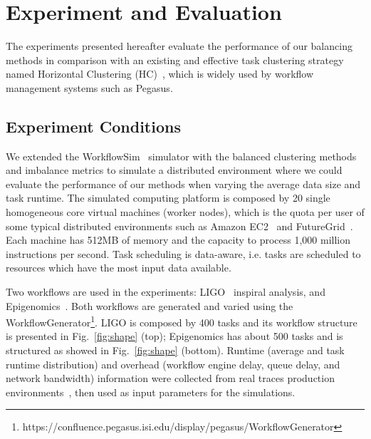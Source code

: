 \documentclass[final,5p,times,twocolumn]{elsarticle}
\begin{document}
\section{Experiment and Evaluation}
\label{sec:experiments}

The experiments presented hereafter evaluate the performance of our balancing methods in comparison with an existing and effective task clustering strategy named Horizontal Clustering (HC)~\cite{Singh:2008:WTC:1341811.1341822}, which is widely used by workflow management systems such as Pegasus. 

\subsection{Experiment Conditions}

We extended the WorkflowSim~\cite{WorkflowSim} simulator with the balanced clustering methods and imbalance metrics to simulate a distributed environment where we could evaluate the performance of our methods when varying the average data size and task runtime. The simulated computing platform is composed by 20 single homogeneous core virtual machines (worker nodes), which is the quota per user of some typical distributed environments such as Amazon EC2~\cite{AmazonAWS} and FutureGrid~\cite{FutureGrid}. Each machine has 512MB of memory and the capacity to process 1,000 million instructions per second. Task scheduling is data-aware, i.e. tasks are scheduled to resources which have the most input data available.

Two workflows are used in the experiments: LIGO~\cite{LIGO} inspiral analysis, and Epigenomics~\cite{Epigenome}. 
Both workflows are generated and varied using the WorkflowGenerator\footnote[1]{https://confluence.pegasus.isi.edu/display/pegasus/WorkflowGenerator}. LIGO is composed by 400 tasks and its workflow structure is presented in Fig.~\ref{fig:shape} (top); Epigenomics has about 500 tasks and is structured as showed in Fig.~\ref{fig:shape} (bottom). Runtime (average and task runtime distribution) and overhead (workflow engine delay, queue delay, and network bandwidth) information were collected from real traces production environments~\cite{Chen, Juve2013}, then used as input parameters for the simulations.

\end{document}
